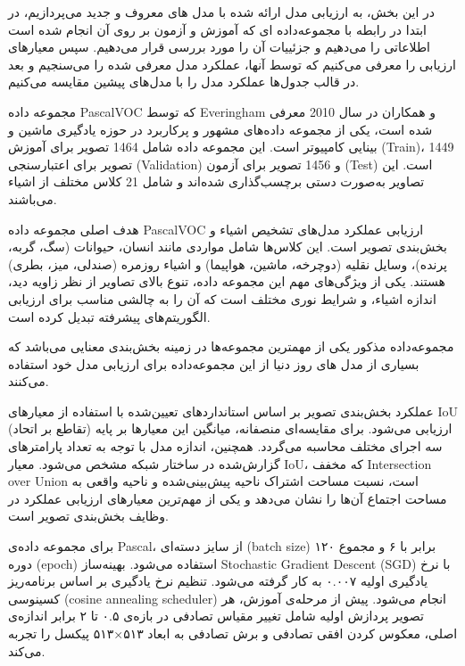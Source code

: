 

\label{section:experiment}

در این بخش، به ارزیابی مدل ارائه شده با مدل های معروف و جدید می‌پردازیم، در ابتدا در رابطه با مجموعه‌داده ای که آموزش و آزمون بر روی آن انجام شده است اطلاعاتی را می‌دهیم و جزئییات آن را مورد بررسی قرار می‌دهیم. سپس معیارهای ارزیابی را معرفی می‌کنیم که توسط آنها، عملکرد مدل معرفی شده را می‌سنجیم و بعد در قالب جدول‌ها عملکرد مدل را با مدل‌های پیشین مقایسه می‌کنیم.


مجموعه داده PascalVOC که توسط Everingham و همکاران در سال 2010 معرفی شده است، یکی از مجموعه داده‌های مشهور و پرکاربرد در حوزه یادگیری ماشین و بینایی کامپیوتر است\cite{Everingham2010ThePV}. این مجموعه داده شامل 1464 تصویر برای آموزش (Train)، 1449 تصویر برای اعتبارسنجی (Validation) و 1456 تصویر برای آزمون (Test) است. این تصاویر به‌صورت دستی برچسب‌گذاری شده‌اند و شامل 21 کلاس مختلف از اشیاء می‌باشند.

هدف اصلی مجموعه داده PascalVOC ارزیابی عملکرد مدل‌های تشخیص اشیاء و بخش‌بندی تصویر است. این کلاس‌ها شامل مواردی مانند انسان، حیوانات (سگ، گربه، پرنده)، وسایل نقلیه (دوچرخه، ماشین، هواپیما) و اشیاء روزمره (صندلی، میز، بطری) هستند. یکی از ویژگی‌های مهم این مجموعه داده، تنوع بالای تصاویر از نظر زاویه دید، اندازه اشیاء، و شرایط نوری مختلف است که آن را به چالشی مناسب برای ارزیابی الگوریتم‌های پیشرفته تبدیل کرده است.

مجموعه‌داده مذکور یکی از مهمترین مجموعه‌ها در زمینه بخش‌بندی معنایی می‌باشد که بسیاری از مدل های روز دنیا از این مجموعه‌داده برای ارزیابی مدل خود استفاده می‌کنند.



عملکرد بخش‌بندی تصویر بر اساس استانداردهای تعیین‌شده با استفاده از معیارهای IoU (تقاطع بر اتحاد) ارزیابی می‌شود. برای مقایسه‌ای منصفانه، میانگین این معیارها بر پایه سه اجرای مختلف محاسبه می‌گردد. همچنین، اندازه مدل با توجه به تعداد پارامترهای گزارش‌شده در ساختار شبکه مشخص می‌شود. معیار IoU، که مخفف Intersection over Union است، نسبت مساحت اشتراک ناحیه پیش‌بینی‌شده و ناحیه واقعی به مساحت اجتماع آن‌ها را نشان می‌دهد و یکی از مهم‌ترین معیارهای ارزیابی عملکرد در وظایف بخش‌بندی تصویر است.


برای مجموعه داده‌ی Pascal، از سایز دسته‌ای (batch size) برابر با ۶ و مجموع ۱۲۰ دوره (epoch) استفاده می‌شود. بهینه‌ساز Stochastic Gradient Descent (SGD) با نرخ یادگیری اولیه ۰.۰۰۷ به کار گرفته می‌شود. تنظیم نرخ یادگیری بر اساس برنامه‌ریز کسینوسی (cosine annealing scheduler) انجام می‌شود. پیش از مرحله‌ی آموزش، هر تصویر پردازش اولیه شامل تغییر مقیاس تصادفی در بازه‌ی ۰.۵ تا ۲ برابر اندازه‌ی اصلی، معکوس کردن افقی تصادفی و برش تصادفی به ابعاد ۵۱۳×۵۱۳ پیکسل را تجربه می‌کند.

